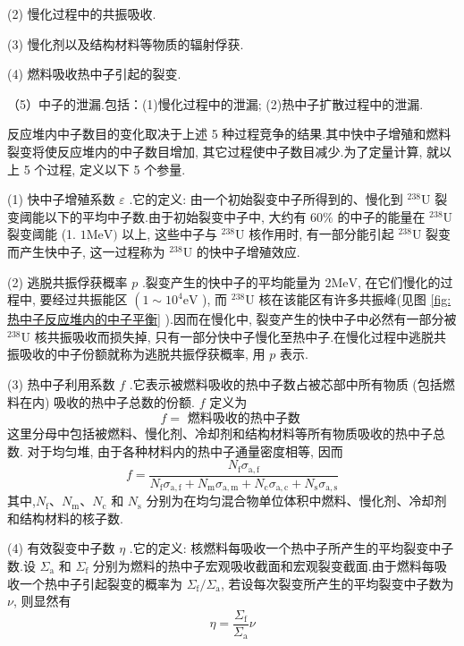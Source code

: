 \documentclass{Sichuan Normal University}
\begin{document}
(2) 慢化过程中的共振吸收.

(3) 慢化剂以及结构材料等物质的辐射俘获.

(4) 燃料吸收热中子引起的裂变.

（5）中子的泄漏.包括：(1)慢化过程中的泄漏; (2)热中子扩散过程中的泄漏.

反应堆内中子数目的变化取决于上述 5 种过程竞争的结果.其中快中子增殖和燃料裂变将使反应堆内的中子数目增加, 其它过程使中子数目减少.为了定量计算, 就以上 5 个过程, 定义以下 5 个参量.

(1) 快中子增殖系数 $\varepsilon$ .它的定义: 由一个初始裂变中子所得到的、慢化到 ${ }^{238} \mathrm{U}$ 裂变阈能以下的平均中子数.由于初始裂变中子中, 大约有 $60 \%$ 的中子的能量在 ${ }^{238} \mathrm{U}$ 裂变阈能 (1. $1 \mathrm{MeV})$ 以上, 这些中子与 ${ }^{238} \mathrm{U}$ 核作用时, 有一部分能引起 ${ }^{238} \mathrm{U}$ 裂变而产生快中子, 这一过程称为 ${ }^{238} \mathrm{U}$ 的快中子增殖效应.

(2) 逃脱共振俘获概率 $p$ .裂变产生的快中子的平均能量为 $2 \mathrm{MeV}$, 在它们慢化的过程中, 要经过共振能区 $\left(1 \sim 10^4 \mathrm{eV}\right.$ ), 而 ${ }^{238} \mathrm{U}$ 核在该能区有许多共振峰(见图 \ref{fig:热中子反应堆内的中子平衡} ).因而在慢化中, 裂变产生的快中子中必然有一部分被 ${ }^{238} \mathrm{U}$ 核共振吸收而损失掉, 只有一部分快中子慢化至热中子.在慢化过程中逃脱共振吸收的中子份额就称为逃脱共振俘获概率, 用 $p$ 表示.

(3) 热中子利用系数 $f$ .它表示被燃料吸收的热中子数占被芯部中所有物质 (包括燃料在内) 吸收的热中子总数的份额. $f$ 定义为
\begin{equation}
    f=\text { 燃料吸收的热中子数 }
\end{equation}
这里分母中包括被燃料、慢化剂、冷却剂和结构材料等所有物质吸收的热中子总数.
对于均匀堆, 由于各种材料内的热中子通量密度相等, 因而
\begin{equation}
    f=\frac{N_{\mathrm{f}} \sigma_{\mathrm{a}, \mathrm{f}}}{N_{\mathrm{f}} \sigma_{\mathrm{a}, \mathrm{f}}+N_{\mathrm{m}} \sigma_{\mathrm{a}, \mathrm{m}}+N_{\mathrm{c}} \sigma_{\mathrm{a}, \mathrm{c}}+N_{\mathrm{s}} \sigma_{\mathrm{a}, \mathrm{s}}}
\end{equation}
其中,$N_{\mathrm{f}} 、 N_{\mathrm{m}} 、 N_{\mathrm{c}}$ 和 $N_{\mathrm{s}}$ 分别为在均匀混合物单位体积中燃料、慢化剂、冷却剂和结构材料的核子数.

(4) 有效裂变中子数 $\eta$ .它的定义: 核燃料每吸收一个热中子所产生的平均裂变中子数.设 $\Sigma_{\mathrm{a}}$ 和 $\Sigma_{\mathrm{f}}$ 分别为燃料的热中子宏观吸收截面和宏观裂变截面.由于燃料每吸收一个热中子引起裂变的概率为 $\Sigma_{\mathrm{f}} / \Sigma_{\mathrm{a}}$, 若设每次裂变所产生的平均裂变中子数为 $\nu$, 则显然有
\begin{equation}
\eta=\frac{\Sigma_{\mathrm{f}}}{\Sigma_{\mathrm{a}}} \nu
\end{equation}
\end{document}
